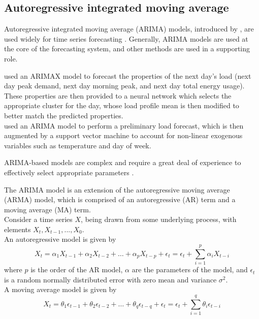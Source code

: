\subsection{Autoregressive integrated moving average}
Autoregressive integrated moving average (ARIMA) models, introduced by \citet{Box1970}, are used widely for time series forecasting \citep{Weron2006}. 
Generally, ARIMA models are used at the core of the forecasting system, and other methods are used in a supporting role. 
\par
\citet{Bennett2014} used an ARIMAX model to forecast the properties of the next day's load (next day peak demand, next day morning peak, and next day total energy usage). These properties are then provided to a neural network which selects the appropriate cluster for the day, whose load profile mean is then modified to better match the predicted properties.
\\
\citet{Karthika2017} used an ARIMA model to perform a preliminary load forecast, which is then augmented by a support vector machine to account for non-linear exogenous variables such as temperature and day of week.
\par
ARIMA-based models are complex and require a great deal of experience to effectively select appropriate parameters \citep{Desouky2000}.
\par
The ARIMA model is an extension of the autoregressive moving average (ARMA) model, which is comprised of an autoregressive (AR) term and a moving average (MA) term.
\\
Consider a time series $X$, being drawn from some underlying process, with elements $X_{t}, X_{t-1}, ..., X_{0}$. 
\\
An autoregressive model is given by
\begin{equation}
X_{t} = \alpha_{1}X_{t-1} + \alpha_{2}X_{t-2} + \ldots + \alpha_{p}X_{t-p} + \epsilon_{t} = \epsilon_{t} + \sum_{i=1}^{p}\alpha_{i}X_{t-i}
\end{equation}
where $p$ is the order of the AR model, $\alpha$ are the parameters of the model, and $\epsilon_{t}$ is a random normally distributed error with zero mean and variance $\sigma^2$. 
\\ 
A moving average model is given by 
\begin{equation}
X_{t} = \theta_{1}\epsilon_{t-1} + \theta_{2}\epsilon_{t-2} + \ldots + \theta_{q}\epsilon_{t-q} + \epsilon_{t} = \epsilon_{t} + \sum_{i=1}^{q}\theta_{i}\epsilon_{t-i}
\end{equation}
